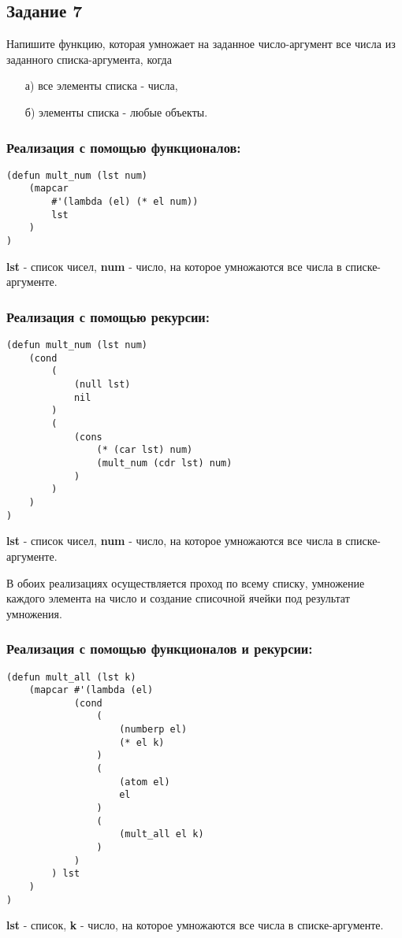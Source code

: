 \documentclass[a4paper,12pt]{article}
\begin{document}
\subsection*{Задание 7}

Напишите функцию, которая умножает на заданное число-аргумент все числа из заданного списка-аргумента, когда
\begin{enumerate}
	\item[а)] все элементы списка - числа,
	\item[б)] элементы списка - любые объекты.
\end{enumerate}

\subsubsection*{Реализация с помощью функционалов:}
\begin{lstlisting}[caption=Функция умножения для списка из чисел]
(defun mult_num (lst num)
	(mapcar 
		#'(lambda (el) (* el num))
		lst
	)
)
\end{lstlisting}
\textbf{lst} - список чисел,  \textbf{num} - число, на которое умножаются все числа в списке-аргументе.

\subsubsection*{Реализация с помощью рекурсии:}
\begin{lstlisting}[caption=Функция умножения для списка из чисел]
(defun mult_num (lst num)
	(cond
		(
			(null lst)
			nil
		)
		(
			(cons 
				(* (car lst) num)
				(mult_num (cdr lst) num)
			)
		)
	)
)
\end{lstlisting}
\textbf{lst} - список чисел,  \textbf{num} - число, на которое умножаются все числа в списке-аргументе.

В обоих реализациях осуществляется проход по всему списку, умножение каждого элемента на число и создание списочной ячейки под результат умножения.

\subsubsection*{Реализация с помощью функционалов и рекурсии:}
\begin{lstlisting}[caption=Функция умножения для списка из любых объектов]
(defun mult_all (lst k)
	(mapcar #'(lambda (el)
			(cond
				(
					(numberp el)
					(* el k)
				)
				(
					(atom el)
					el
				)
				(
					(mult_all el k)
				)
			)
		) lst
	)
)
\end{lstlisting}
\textbf{lst} - список,  \textbf{k} - число, на которое умножаются все числа в списке-аргументе.
\end{document}
